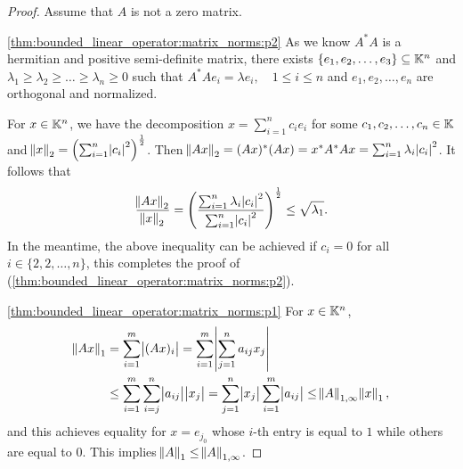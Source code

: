 \begin{proof}
Assume that $A$ is not a zero matrix. 

\ref{thm:bounded_linear_operator:matrix_norms:p2}
As we know $A^\ast A$ is a hermitian and positive semi-definite matrix, 
there exists $\left\{ e_1, e_2, \ldots, e_3 \right\} \subseteq \mathbb{K}^n$ and 
$\lambda_1 \ge \lambda_2 \ge \ldots \ge\lambda_n \ge 0$ such that 
$A^\ast A e_i = \lambda e_i, \quad 1 \le i \le n$ and $e_1, e_2, \ldots, 
e_n$ are orthogonal and normalized. 

For $x \in \mathbb{K}^n$, we have the decomposition $x = \sum_{i=1}^{n} c_i e_i$ 
for some $c_1, c_2, \ldots, c_n \in \mathbb{K}$ and $\norm{x}_2 = \left( 
\sum_{i=1}^{n} \abs{c_i}^2 \right) ^\frac{1}{2}$. 
Then $\norm{Ax}_2 = (Ax)^\ast (Ax) = x^\ast A^\ast A x = \sum_{i=1}^{n} 
\lambda_i \abs{c_i}^2$. 
It follows that 
\begin{equation*}
    \frac{\norm{Ax}_2}{\norm{x}_2} = \left( \frac{\sum_{i=1}^{n} \lambda_i 
    \abs{c_i}^2}{\sum_{i=1}^{n}\abs{c_i}^2} \right)^\frac{1}{2} 
    \le \sqrt{\lambda_1}. 
\end{equation*}
In the meantime, the above inequality can be achieved if $c_i = 0$ for all 
$i \in \{2, 2, \ldots, n\}$, this completes the proof of 
(\ref{thm:bounded_linear_operator:matrix_norms:p2}). 

\ref{thm:bounded_linear_operator:matrix_norms:p1}
For $x \in \mathbb{K}^n$, 
\begin{equation*}
    \begin{aligned}
        \norm{Ax}_1 &= \sum_{i=1}^{m} \abs{(Ax)_i} 
        = \sum_{i=1}^{m} \abs{\sum_{j=1}^{n} a_{ij} x_j} \\ 
        &\le \sum_{i=1}^{m} \sum_{i=j}^{n} \abs{a_{ij}} \abs{x_j} 
        = \sum_{j=1}^{n} \abs{x_j} \sum_{i=1}^{m} \abs{a_{ij}} 
        \le \norm{A}_{1, \infty} \norm{x}_1, 
    \end{aligned}
\end{equation*}
and this achieves equality for $x = e_{j_0}$ whose $i$-th entry is equal to 
$1$ while others are equal to $0$.
This implies $\norm{A}_1 \le \norm{A}_{1, \infty}$. 


\end{proof}
